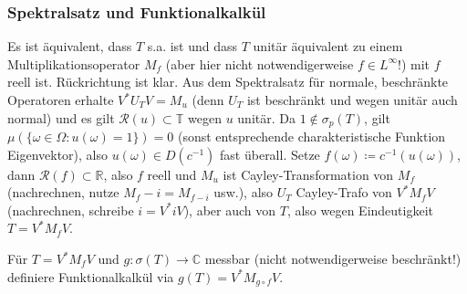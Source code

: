 \documentclass[11pt,a4paper]{scrartcl}
\newcommand{\R}{\mathbb{R}} %
\newcommand{\C}{\mathbb{C}} %
\newcommand{\Rc}{\mathcal{R}}
\theoremstyle{plain}
\theoremstyle{definition}
\theoremstyle{remark}
\begin{document}
\subsubsection{Spektralsatz und Funktionalkalkül}

Es ist äquivalent, dass $T$ s.a. ist und dass $T$ unitär äquivalent zu einem Multiplikationsoperator $M_f$ (aber hier nicht notwendigerweise $f\in L^\infty$!) mit $f$ reell ist. Rückrichtung ist klar. Aus dem Spektralsatz für normale, beschränkte Operatoren erhalte $V^*U_TV=M_u$ (denn $U_T$ ist beschränkt und wegen unitär auch normal) und es gilt $\Rc(u)\subset \mathbb T$ wegen $u$ unitär. Da $1\not\in \sigma_p(T)$, gilt $\mu(\{\omega\in \Omega: u(\omega)=1\})=0$ (sonst entsprechende charakteristische Funktion Eigenvektor), also $u(\omega)\in D(c^{-1})$ fast überall. Setze $f(\omega)\coloneqq c^{-1}(u(\omega))$, dann $\Rc(f) \subset \R$, also $f$ reell und $M_u$ ist Cayley-Transformation von $M_f$ (nachrechnen, nutze $M_f-i=M_{f-i}$ usw.), also $U_T$ Cayley-Trafo von $V^*M_fV$ (nachrechnen, schreibe $i=V^*iV$), aber auch von $T$, also wegen Eindeutigkeit $T=V^*M_fV$.

Für $T=V^*M_fV$ und $g:\sigma(T)\to \C$ messbar (nicht notwendigerweise beschränkt!) definiere Funktionalkalkül via $g(T)=V^*M_{g\circ f}V$.
\end{document}
